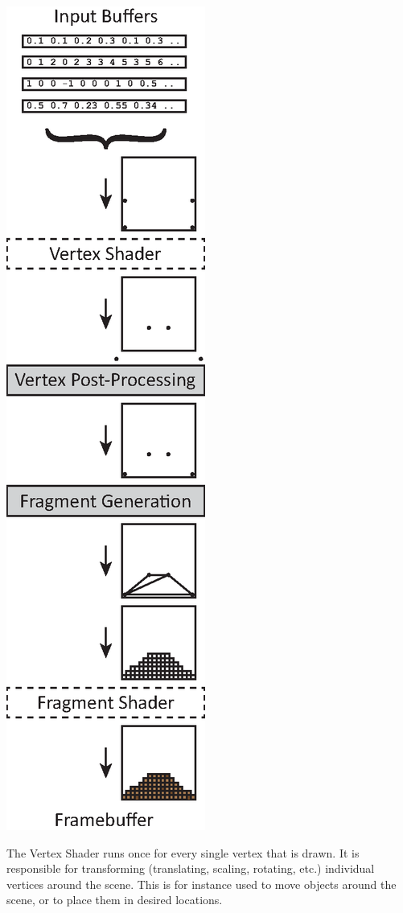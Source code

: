 \centerline {
	\includegraphics[scale=1.1]{images/pipeline-overview.eps}
}

The Vertex Shader runs once for every single vertex that is drawn. It is responsible for transforming (translating, scaling, rotating, etc.) individual vertices around the scene. This is for instance used to move objects around the scene, or to place them in desired locations. 

